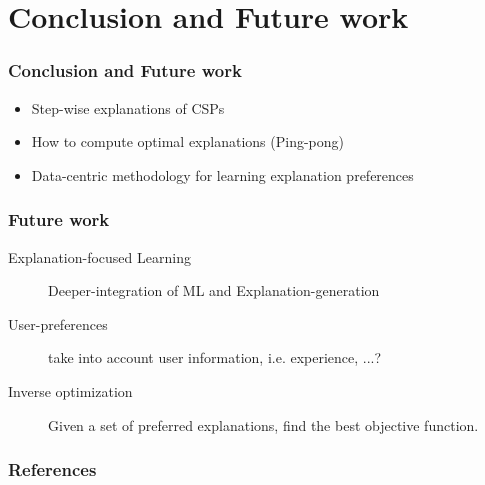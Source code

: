 \documentclass{beamer}
\begin{document}
			
		\section{Conclusion and Future work}
		 \begin{frame}
			\tableofcontents[currentsection]
		\end{frame}			
%		
\begin{frame}
	\frametitle{Conclusion and Future work}
	\begin{itemize}
		\item Step-wise explanations of CSPs
		\item How to compute optimal explanations (Ping-pong)
		\item Data-centric methodology for learning explanation preferences
	\end{itemize}
	
\end{frame}
%		

				
	\begin{frame}
		\frametitle{Future work}
		\begin{description}
			\item[Explanation-focused Learning] Deeper-integration of ML and Explanation-generation
			\item[User-preferences] take into account user information, i.e. experience, ...?
			\item[Inverse optimization] Given a set of preferred explanations, find the best objective function.
		\end{description}
	\end{frame}
			
		\begin{frame}[allowframebreaks]
			\frametitle{References}
			
			
		\end{frame}		
	
	
\end{document}
